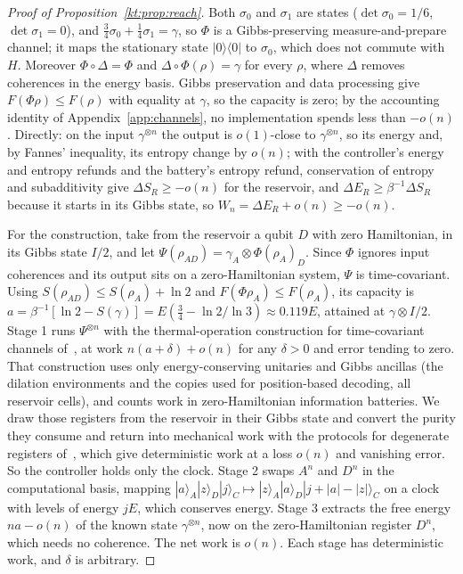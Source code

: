 \begin{proof}[Proof of Proposition~\ref{kt:prop:reach}]
Both $\sigma_0$ and $\sigma_1$ are states ($\det\sigma_0=1/6$, $\det\sigma_1=0$), and $\tfrac34\sigma_0+\tfrac14\sigma_1=\gamma$, so $\Phi$ is a Gibbs-preserving measure-and-prepare channel; it maps the stationary state $|0\rangle\langle0|$ to $\sigma_0$, which does not commute with $H$. Moreover $\Phi\circ\Delta=\Phi$ and $\Delta\circ\Phi(\rho)=\gamma$ for every $\rho$, where $\Delta$ removes coherences in the energy basis. Gibbs preservation and data processing give $F(\Phi\rho)\le F(\rho)$ with equality at $\gamma$, so the capacity is zero; by the accounting identity of Appendix~\ref{app:channels}, no implementation spends less than $-o(n)$. Directly: on the input $\gamma^{\otimes n}$ the output is $o(1)$-close to $\gamma^{\otimes n}$, so its energy and, by Fannes' inequality, its entropy change by $o(n)$; with the controller's energy and entropy refunds and the battery's entropy refund, conservation of entropy and subadditivity give $\Delta S_R\ge-o(n)$ for the reservoir, and $\Delta E_R\ge\beta^{-1}\Delta S_R$ because it starts in its Gibbs state, so $W_n=\Delta E_R+o(n)\ge-o(n)$.

For the construction, take from the reservoir a qubit $D$ with zero Hamiltonian, in its Gibbs state $I/2$, and let $\Psi(\rho_{AD})=\gamma_A\otimes\Phi(\rho_A)_D$. Since $\Phi$ ignores input coherences and its output sits on a zero-Hamiltonian system, $\Psi$ is time-covariant. Using $S(\rho_{AD})\le S(\rho_A)+\ln2$ and $F(\Phi\rho_A)\le F(\rho_A)$, its capacity is $a=\beta^{-1}[\ln2-S(\gamma)]=E(\tfrac34-\ln2/\ln3)\approx0.119E$, attained at $\gamma\otimes I/2$. Stage 1 runs $\Psi^{\otimes n}$ with the thermal-operation construction for time-covariant channels of~\cite[Thm.~7.1]{FBB21}, at work $n(a+\delta)+o(n)$ for any $\delta>0$ and error tending to zero. That construction uses only energy-conserving unitaries and Gibbs ancillas (the dilation environments and the copies used for position-based decoding, all reservoir cells), and counts work in zero-Hamiltonian information batteries. We draw those registers from the reservoir in their Gibbs state and convert the purity they consume and return into mechanical work with the protocols for degenerate registers of~\cite{HorodeckiOppenheim13}, which give deterministic work at a loss $o(n)$ and vanishing error. So the controller holds only the clock. Stage 2 swaps $A^n$ and $D^n$ in the computational basis, mapping $|a\rangle_A|z\rangle_D|j\rangle_C\mapsto|z\rangle_A|a\rangle_D|j+|a|-|z|\rangle_C$ on a clock with levels of energy $jE$, which conserves energy. Stage 3 extracts the free energy $na-o(n)$ of the known state $\gamma^{\otimes n}$, now on the zero-Hamiltonian register $D^n$, which needs no coherence. The net work is $o(n)$. Each stage has deterministic work, and $\delta$ is arbitrary.


\end{proof}
